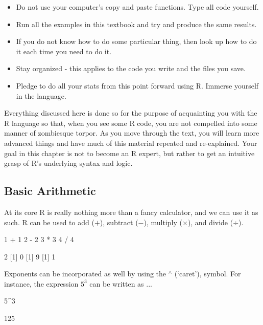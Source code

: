 \begin{itemize}
    \item Do not use your computer's copy and paste functions.  Type all code yourself.
    \item Run all the examples in this textbook and try and produce the same results.
    \item If you do not know how to do some particular thing, then look up how to do it each time you need to do it.
    \item Stay organized - this applies to the code you write and the files you save.
    \item Pledge to do all your stats from this point forward using R. Immerse yourself in the language.
\end{itemize}

\noindent
Everything discussed here is done so for the purpose of acquainting you with the R language so that, when you see some R code, you are not compelled into some manner of zombiesque torpor.  As you move through the text, you will learn more advanced things and have much of this material repeated and re-explained.  Your goal in this chapter is not to become an R expert, but rather to get an intuitive grasp of R's underlying syntax and logic.


\subsection{Basic Arithmetic}

At its core R is really nothing more than a fancy calculator, and we can use it as such.  R can be used to add ($+$), subtract ($-$), multiply ($\times$), and divide ($\div$).

\begin{inR}
1 + 1
2 - 2
3 * 3
4 / 4
\end{inR}

\begin{outR}
[1] 2
[1] 0
[1] 9
[1] 1
\end{outR}

Exponents can be incorporated as well by using the $^\wedge$ (`caret'), symbol. For instance, the expression $5^3$ can be written as ...

\begin{inR}
5^3
\end{inR}

\begin{outR}
[1] 125
\end{outR}


